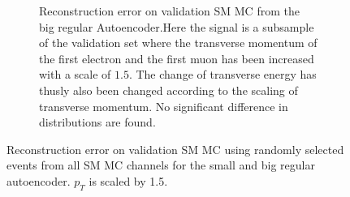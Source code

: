 \begin{figure}[h!]
\begin{subfigure}{.45\textwidth}
        \caption{Reconstruction error on validation SM MC from the big regular Autoencoder.Here the signal is a subsample of the validation 
        set where the transverse momentum of the first electron and the first muon has been increased with a scale of $1.5$. The change of transverse 
        energy has thusly also been changed according to the scaling of transverse momentum. No significant difference in distributions are found. }
        \label{fig:ae_big_pt_1_5}
    \end{subfigure}
    \hfill 
    \caption[AE | Reconstruction error $p_T$ altering of 1.5]{Reconstruction error on validation SM MC using randomly selected events from all SM MC channels for the small and big regular autoencoder. 
    $p_T$ is scaled by 1.5. }
    \label{fig:ae_big_small_pt_1_5}
\end{figure}

